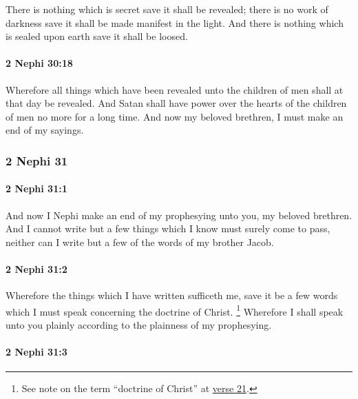 			There is nothing which is secret save it shall be revealed;
			there is no work of darkness save it shall be made manifest in the light.
			And there is nothing which is sealed upon earth save it shall be loosed.

		\paragraph{2 Nephi 30:18} %
			\label{2NEPHI-30-18}

			Wherefore all things which have been revealed unto the children of men
			shall at that day be revealed.
			And Satan shall have power over the hearts of the children of men no more
			for a long time.
			And now my beloved brethren, I must make an end of my sayings.

	\subsubsection{2 Nephi 31} %
		\label{2NEPHI-31}
		
		\paragraph{2 Nephi 31:1} %
			\label{2NEPHI-31-1}

			And now I Nephi make an end of my prophesying unto you, my beloved brethren.
			And I cannot write but a few things which I know must surely come to pass,
			neither can I write but a few of the words of my brother Jacob.

		\paragraph{2 Nephi 31:2} %
			\label{2NEPHI-31-2}

			Wherefore the things which I have written sufficeth me,
			save it be a few words which I must speak concerning the doctrine of Christ.%
			\footnote{%
				See note on the term ``doctrine of Christ'' at \hyperref[2NEPHI-31-21]{verse 21}.
				} 
			Wherefore I shall speak unto you plainly
			according to the plainness of my prophesying.

		\paragraph{2 Nephi 31:3} %
			\label{2NEPHI-31-3}

